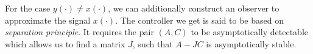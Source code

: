  




%
%
%

For the case $y(\cdot) \neq x(\cdot)$, we can additionally construct an observer to approximate the signal $x(\cdot)$. The  controller we get is said to be based on \textit{separation principle}.
It requires the pair $(A,C)$ to be asymptotically detectable 
which allows us to find a matrix $J$, such that $A - JC$ is asymptotically stable.

